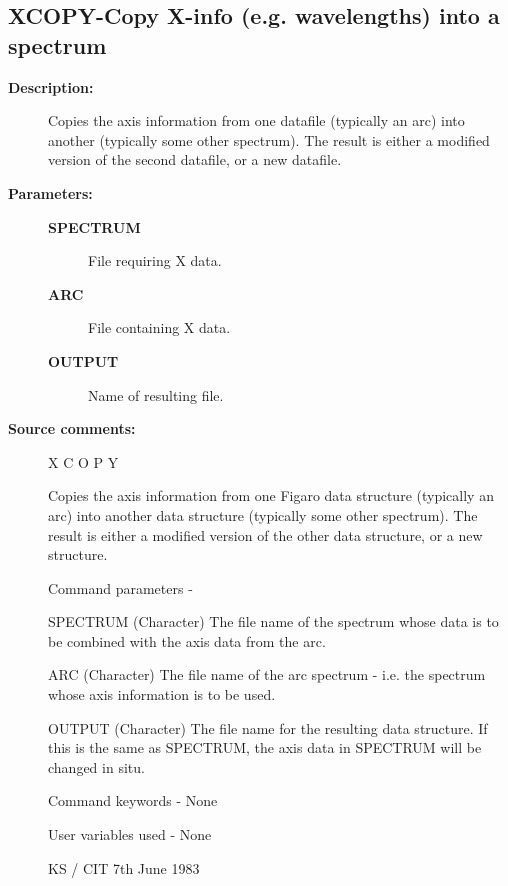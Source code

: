 \subsection{XCOPY-\label{XCOPY}Copy X-info (e.g. wavelengths) into a spectrum}
\begin{description}

\item [\textbf{Description:}]
 Copies the axis information from one datafile (typically an
 arc) into another (typically some other spectrum).  The
 result is either a modified version of the second datafile,
 or a new datafile.

\item [\textbf{Parameters:}]
\begin{description}
\item [\textbf{SPECTRUM}]
 File requiring X data.
\item [\textbf{ARC}]
 File containing X data.
\item [\textbf{OUTPUT}]
 Name of resulting file.
\end{description}

\item [\textbf{Source comments:}]
\begin{terminalv}
 X C O P Y

 Copies the axis information from one Figaro data structure
 (typically an arc) into another data structure (typically
 some other spectrum).  The result is either a modified version
 of the other data structure, or a new structure.

 Command parameters -

 SPECTRUM    (Character) The file name of the spectrum whose
             data is to be combined with the axis data from the
             arc.

 ARC         (Character) The file name of the arc spectrum - i.e.
             the spectrum whose axis information is to be used.

 OUTPUT      (Character) The file name for the resulting data
             structure.  If this is the same as SPECTRUM, the
             axis data in SPECTRUM will be changed in situ.

 Command keywords - None

 User variables used - None

                                         KS / CIT 7th June 1983
\end{terminalv}
\end{description}
